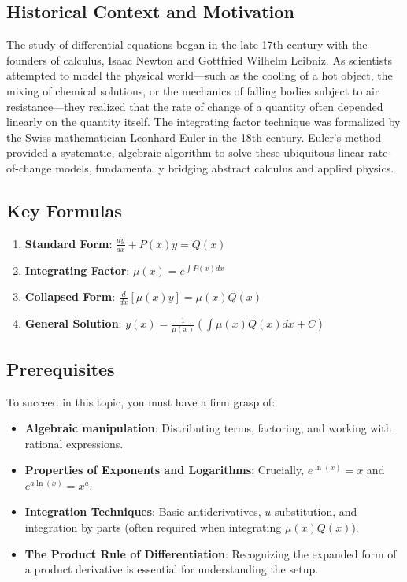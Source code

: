 \documentclass[11pt]{article}
\begin{document}
\subsection{Historical Context and Motivation}
The study of differential equations began in the late 17th century with the founders of calculus, Isaac Newton and Gottfried Wilhelm Leibniz. As scientists attempted to model the physical world—such as the cooling of a hot object, the mixing of chemical solutions, or the mechanics of falling bodies subject to air resistance—they realized that the rate of change of a quantity often depended linearly on the quantity itself. The integrating factor technique was formalized by the Swiss mathematician Leonhard Euler in the 18th century. Euler's method provided a systematic, algebraic algorithm to solve these ubiquitous linear rate-of-change models, fundamentally bridging abstract calculus and applied physics.

\subsection{Key Formulas}
\begin{enumerate}
    \item \textbf{Standard Form}: $\frac{dy}{dx} + P(x)y = Q(x)$
    \item \textbf{Integrating Factor}: $\mu(x) = e^{\int P(x) dx}$
    \item \textbf{Collapsed Form}: $\frac{d}{dx} [\mu(x) y] = \mu(x) Q(x)$
    \item \textbf{General Solution}: $y(x) = \frac{1}{\mu(x)} \left( \int \mu(x) Q(x) dx + C \right)$
\end{enumerate}

\subsection{Prerequisites}
To succeed in this topic, you must have a firm grasp of:
\begin{itemize}
    \item \textbf{Algebraic manipulation}: Distributing terms, factoring, and working with rational expressions.
    \item \textbf{Properties of Exponents and Logarithms}: Crucially, $e^{\ln(x)} = x$ and $e^{a \ln(x)} = x^a$.
    \item \textbf{Integration Techniques}: Basic antiderivatives, $u$-substitution, and integration by parts (often required when integrating $\mu(x) Q(x)$).
    \item \textbf{The Product Rule of Differentiation}: Recognizing the expanded form of a product derivative is essential for understanding the setup.
\end{itemize}
\end{document}
